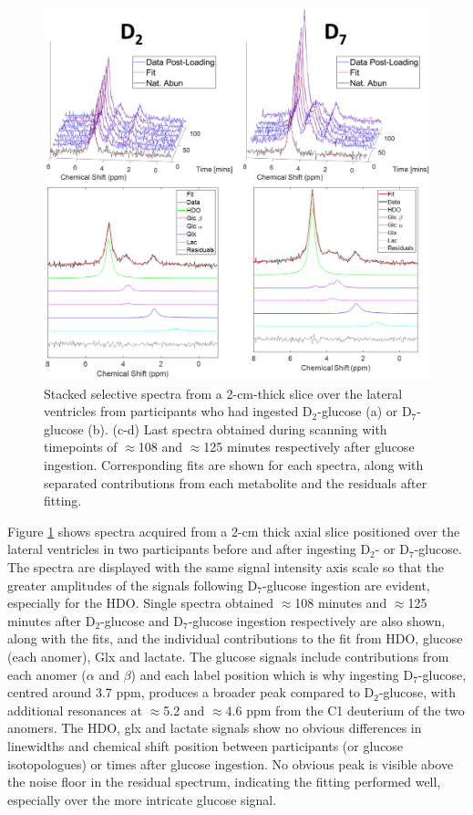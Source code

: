 \documentclass[class=article, crop=false]{standalone}
\begin{document}
\begin{figure}
    \centering
    \includegraphics[width = 1\textwidth]{Figures/Glucose/Selective.png}
    \caption{Stacked selective spectra from a 2-cm-thick slice over the lateral ventricles from participants who had ingested D$_2$-glucose (a) or D$_7$-glucose (b). (c-d) Last spectra obtained during scanning with timepoints of $\approx$108 and $\approx$125 minutes respectively after glucose ingestion. Corresponding fits are shown for each spectra, along with separated contributions from each metabolite and the residuals after fitting.}
    \label{fig:Glu:Select}
\end{figure}

Figure \ref{fig:Glu:Select} shows spectra acquired from a 2-cm thick axial slice positioned over the lateral ventricles in two participants before and after ingesting D$_2$- or D$_7$-glucose. The spectra are displayed with the same signal intensity axis scale so that the greater amplitudes of the signals following D$_7$-glucose ingestion are evident, especially for the HDO. Single spectra obtained $\approx$108 minutes and $\approx$125 minutes after D$_2$-glucose and D$_7$-glucose ingestion respectively are also shown, along with the fits, and the individual contributions to the fit from HDO, glucose (each anomer), Glx and lactate. The glucose signals include contributions from each anomer ($\alpha$ and $\beta$) and each label position which is why ingesting D$_7$-glucose, centred around 3.7 ppm, produces a broader peak compared to D$_2$-glucose, with additional resonances at $\approx$5.2 and $\approx$4.6 ppm from the C1 deuterium of the two anomers. The HDO, glx and lactate signals show no obvious differences in linewidths and chemical shift position between participants (or glucose isotopologues) or times after glucose ingestion. No obvious peak is visible above the noise floor in the residual spectrum, indicating the fitting performed well, especially over the more intricate glucose signal.
\end{document}

